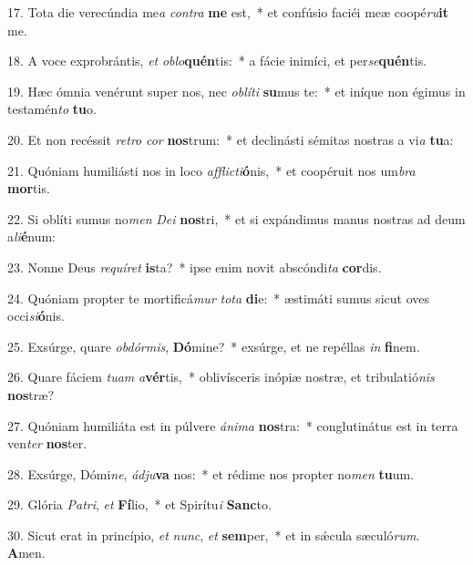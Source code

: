17. Tota die verecúndia me\textit{a} \textit{con}\textit{tra} \textbf{me} est,~*  et confúsio faciéi meæ coopé\textit{ru}\textbf{it} me.\

18. A voce exprobrántis, \textit{et} \textit{ob}\textit{lo}\textbf{quén}tis:~*  a fácie inimíci, et per\textit{se}\textbf{quén}tis.\

19. Hæc ómnia venérunt super nos, nec \textit{ob}\textit{lí}\textit{ti} \textbf{su}mus te:~*  et iníque non égimus in testamén\textit{to} \textbf{tu}o.\

20. Et non recéssit \textit{re}\textit{tro} \textit{cor} \textbf{nos}trum:~*  et declinásti sémitas nostras a vi\textit{a} \textbf{tu}a:\

21. Quóniam humiliásti nos in loco \textit{af}\textit{flic}\textit{ti}\textbf{ó}nis,~*  et coopéruit nos um\textit{bra} \textbf{mor}tis.\

22. Si oblíti sumus no\textit{men} \textit{De}\textit{i} \textbf{nos}tri,~*  et si expándimus manus nostras ad deum a\textit{li}\textbf{é}num:\

23. Nonne Deus \textit{re}\textit{quí}\textit{ret} \textbf{is}ta?~*  ipse enim novit abscóndi\textit{ta} \textbf{cor}dis.\

24. Quóniam propter te mortificá\textit{mur} \textit{to}\textit{ta} \textbf{di}e:~*  æstimáti sumus sicut oves occi\textit{si}\textbf{ó}nis.\

25. Exsúrge, quare \textit{ob}\textit{dór}\textit{mis}, \textbf{Dó}mine?~*  exsúrge, et ne repéllas \textit{in} \textbf{fi}nem.\

26. Quare fáciem \textit{tu}\textit{am} \textit{a}\textbf{vér}tis,~*  oblivísceris inópiæ nostræ, et tribulatió\textit{nis} \textbf{nos}træ?\

27. Quóniam humiliáta est in púlvere \textit{á}\textit{ni}\textit{ma} \textbf{nos}tra:~*  conglutinátus est in terra ven\textit{ter} \textbf{nos}ter.\

28. Exsúrge, Dómi\textit{ne}, \textit{ád}\textit{ju}\textbf{va} nos:~*  et rédime nos propter no\textit{men} \textbf{tu}um.\

29. Glória \textit{Pa}\textit{tri}, \textit{et} \textbf{Fí}lio,~*  et Spirítu\textit{i} \textbf{Sanc}to.\

30. Sicut erat in princípio, \textit{et} \textit{nunc}, \textit{et} \textbf{sem}per,~*  et in sǽcula sæculó\textit{rum}. \textbf{A}men.\

